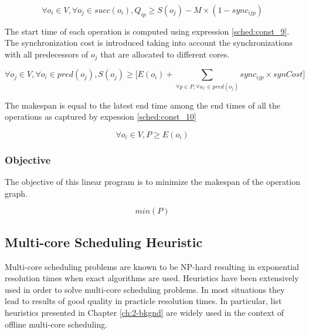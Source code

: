 \begin{equation}
\forall o_i \in V, \forall o_j \in succ(o_i), Q_{ip} \geq S(o_j) - M \times (1-sync_{ijp})
\label{sched:const_8}
\end{equation}

The start time of each operation is computed using expression \ref{sched:const_9}. The synchronization cost is introduced taking into account the synchronizations with all predecessors of $o_j$ that are allocated to different cores. 

\begin{equation}
\forall o_j \in V, \forall o_i \in pred(o_j), S(o_j) \geq \Big[E(o_i) + \sum_{\forall p \in P, \forall o_{i'} \in pred(o_j)}sync_{ijp}\times synCost\Big]
\label{sched:const_9}
\end{equation}

The makespan is equal to the latest end time among the end times of all the operations as captured by expession \ref{sched:const_10}

\begin{equation}
\forall o_i \in V, P \geq E(o_i) 
\label{sched:const_10}
\end{equation}

\subsubsection{Objective}

The objective of this linear program is to minimize the makespan of the operation graph.

\begin{equation}
min(P)
\label{sched:obj}
\end{equation}


\subsection{Multi-core Scheduling Heuristic}

Multi-core scheduling problems are known to be NP-hard resulting in exponential resolution times when exact algorithms are used. Heuristics have been extensively used in order to solve multi-core scheduling problems. In most situations they lead to results of good quality in practicle resolution times. In particular, list heuristics presented in Chapter \ref{ch:2-bkgnd} are widely used in the context of offline multi-core scheduling.

